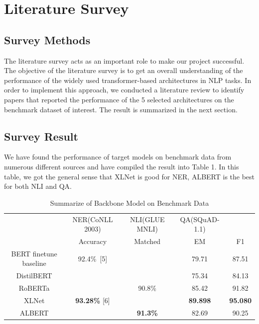 \documentclass{article}
\begin{document}

\section{Literature Survey}
\subsection{Survey Methods}
The literature survey acts as an important role to make our project successful. The objective of the literature survey is to get an overall understanding of the performance of the widely used transformer-based architectures in NLP tasks. In order to implement this approach, we conducted a literature review to identify papers that reported the performance of the 5 selected architectures on the benchmark dataset of interest. The result is summarized in the next section.

\subsection{Survey Result}

We have found the performance of target models on benchmark data from numerous different sources and have compiled the result into Table 1. In this table, we got the general sense that XLNet is good for NER, ALBERT is the best for both NLI and QA. 

\begin{table}[h]
    \centering
    \begin{tabular}{c|c|c|c|c}
        & NER(CoNLL 2003) & NLI(GLUE MNLI) & QA(SQuAD-1.1) &  \\
        & Accuracy & Matched & EM & F1\\
        \hline
        BERT finetune baseline & 92.4\%\ [5] & & 79.71 & 87.51 \\
        DistilBERT &  &  & 75.34 & 84.13 \\
        RoBERTa &  & 90.8\% & 85.42 & 91.82  \\
        XLNet & \textbf{93.28\%} [6] & & \textbf{89.898} & \textbf{95.080}  \\
        ALBERT &  & \textbf{91.3\%} & 82.69 & 90.25  \\
    \end{tabular}
    \caption{Summarize of Backbone Model on Benchmark Data}
    \label{tab:my_label}
\end{table}
\end{document}
